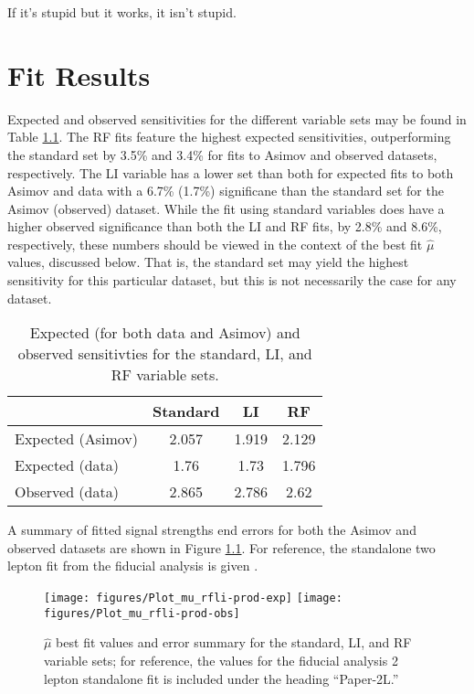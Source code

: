 \begin{savequote}[75mm]
If it's stupid but it works, it isn't stupid.
\end{savequote}

\chapter{Fit Results}

Expected and observed sensitivities for the different variable sets may be found in Table \ref{tab:Sensitivities}.  The RF fits feature the highest expected sensitivities, outperforming the standard set by 3.5\% and 3.4\% for fits to Asimov and observed datasets, respectively.  The LI variable has a lower set than both for expected fits to both Asimov and data with a 6.7\% (1.7\%) significane than the standard set for the Asimov (observed) dataset.  While the fit using standard variables does have a higher observed significance than both the LI and RF fits, by 2.8\% and 8.6\%, respectively, these numbers should be viewed in the context of the best fit $\hat{\mu}$ values, discussed below.  That is, the standard set may yield the highest sensitivity for this particular dataset, but this is not necessarily the case for any dataset.

\begin{table}[!htbp]
\begin{center}
\begin{tabular}{lccc}
\hline\hline
 & Standard &LI &RF\\
\hline
Expected (Asimov) & 2.057 & 1.919 & 2.129\\
\hline
Expected (data) & 1.76 & 1.73 & 1.796\\
\hline
Observed (data) & 2.865 & 2.786 & 2.62\\
\hline
\hline
\end{tabular}
\end{center}
\caption{Expected (for both data and Asimov) and observed sensitivties for the standard, LI, and RF variable sets.}
\label{tab:Sensitivities}
\end{table}

A summary of fitted signal strengths end errors for both the Asimov and observed datasets are shown in Figure \ref{fig:MuhatSummary}.  For reference, the standalone two lepton fit from the fiducial analysis is given .

\begin{figure}[!htbp]\captionsetup{justification=centering}
  \centering
    \texttt{[image: figures/Plot\_mu\_rfli-prod-exp]}
    \texttt{[image: figures/Plot\_mu\_rfli-prod-obs]}
  \caption{$\hat{\mu}$ best fit values and error summary for the standard, LI, and RF variable sets; for reference, the values for the fiducial analysis 2 lepton standalone fit is included under the heading ``Paper-2L.''}
  \label{fig:MuhatSummary}
\end{figure}

